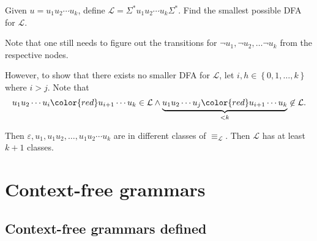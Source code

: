 \documentclass{notes}
\begin{document}
\begin{eg}
  Given $u = u_1 u_2 \cdots u_k$, define $\mathcal L = \Sigma^* u_1 u_2 \cdots u_k \Sigma^*$.
  Find the smallest possible DFA for $\mathcal L$.
  
  \begin{center}
  \end{center}
  
  Note that one still needs to figure out the transitions for $\lnot u_1, \lnot u_2, \dots \lnot u_k$ from the respective nodes.
  
  However, to show that there exists no smaller DFA for $\mathcal L$, let $i, h \in \left \{ 0, 1, \dots, k \right \}$ where $i > j$.
  Note that 
  \[
    u_1 u_2 \cdots u_i {\color{red} u_{i + 1} \cdots u_k} \in \mathcal L \land \underbrace{u_1 u_2 \cdots u_j {\color{red} u_{i + 1} \cdots u_k}}_{< k} \not \in \mathcal L.
  \]
  
  Then $\varepsilon, u_1, u_1 u_2, \dots, u_1 u_2 \cdots u_k$ are in different classes of $\equiv_\mathcal L$.
  Then $\mathcal L$ has at least $k + 1$ classes.
\end{eg}

\section{Context-free grammars}

\subsection{Context-free grammars defined}
\end{document}
